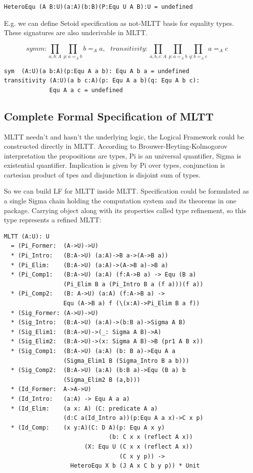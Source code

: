 \documentclass{article}
\begin{document}
\begin{lstlisting}[mathescape=true]
HeteroEqu (A B:U)(a:A)(b:B)(P:Equ U A B):U = undefined
\end{lstlisting}

E.g. we can define Setoid specification \cite{Bishop67} as not-MLTT basis
for equality types. These signatures are also underivable in MLTT.

$$symm : \prod_{a,b:A} \prod_{p:a =_A b} b =_A a,\ \ \ 
  transitivity : \prod_{a,b,c: A} \prod_{p: a =_A b} \prod_{q: b =_A c} a =_A c$$

\begin{lstlisting}[mathescape=true]
sym  (A:U)(a b:A)(p:Equ A a b): Equ A b a = undefined
transitivity (A:U)(a b c:A)(p: Equ A a b)(q: Equ A b c):
             Equ A a c = undefined
\end{lstlisting}

\subsection{Complete Formal Specification of MLTT}

MLTT needn't and hasn't the underlying logic, the Logical Framework could be constructed directly in MLTT.
According to Brouwer-Heyting-Kolmogorov interpretation the propositions are types,
Pi is an universal quantifier, Sigma is existential quantifier.
Implication is given by Pi over types, conjunction is cartesian
product of tpes and disjunction is disjoint sum of types.

So we can build LF for MLTT inside MLTT. Specification could be formulated as a
single Sigma chain holding the computation system and its theorems in one package.
Carrying object along with its properties called type refinement, so this type
represents a refined MLTT:

\begin{lstlisting}[mathescape=true]
MLTT (A:U): U
  = (Pi_Former:  (A->U)->U)
  * (Pi_Intro:   (B:A->U) (a:A)->B a->(A->B a))
  * (Pi_Elim:    (B:A->U) (a:A)->(A->B a)->B a)
  * (Pi_Comp1:   (B:A->U) (a:A) (f:A->B a) -> Equ (B a)
                 (Pi_Elim B a (Pi_Intro B a (f a)))(f a))
  * (Pi_Comp2:   (B: A->U) (a:A) (f:A->B a) ->
                 Equ (A->B a) f (\(x:A)->Pi_Elim B a f))
  * (Sig_Former: (A->U)->U)
  * (Sig_Intro:  (B:A->U) (a:A)->(b:B a)->Sigma A B)
  * (Sig_Elim1:  (B:A->U)->(_: Sigma A B)->A)
  * (Sig_Elim2:  (B:A->U)->(x: Sigma A B)->B (pr1 A B x))
  * (Sig_Comp1:  (B:A->U) (a:A) (b: B a)->Equ A a
                 (Sigma_Elim1 B (Sigma_Intro B a b)))
  * (Sig_Comp2:  (B:A->U) (a:A) (b:B a)->Equ (B a) b
                 (Sigma_Elim2 B (a,b)))
  * (Id_Former:  A->A->U)
  * (Id_Intro:   (a:A) -> Equ A a a)
  * (Id_Elim:    (a x: A) (C: predicate A a)
                 (d:C a(Id_Intro a))(p:Equ A a x)->C x p)
  * (Id_Comp:    (x y:A)(C: D A)(p: Equ A x y)
                              (b: C x x (reflect A x))
                       (X: Equ U (C x x (reflect A x))
                                 (C x y p)) ->
                   HeteroEqu X b (J A x C b y p)) * Unit
\end{lstlisting}
\end{document}
